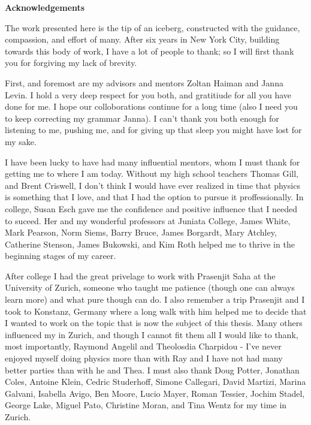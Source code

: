 \newpage

\begin{center}
    {\large \bf Acknowledgements }
\end{center}

\vspace{-0.2cm}


The work presented here is the tip of an iceberg, constructed with the
guidance, compassion, and effort of many. After six years in New York City,
building towards this body of work, I have a lot of people to thank; so
I will first thank you for forgiving my lack of brevity.

First, and foremost are my advisors and mentors Zoltan Haiman and Janna
Levin. I hold a very deep respect for you both, and gratitiude for all you
have done for me. I hope our colloborations continue for a long time (also I
need you to keep correcting my grammar Janna). I can't thank you both enough
for listening to me, pushing me, and for giving up that sleep you might have
lost for my sake.

I have been lucky to have had many influential mentors, whom I must thank for
getting me to where I am today. Without my high school teachers Thomas Gill,
and Brent Criswell, I don't think I would have ever realized in time that
physics is something that I love, and that I had the option to pursue it
proffessionally. In college, Susan Esch gave me the confidence and positive
influence that I needed to suceed. Her and my wonderful professors at Juniata
College, James White, Mark Pearson, Norm Siems, Barry Bruce, James Borgardt,
Mary Atchley, Catherine Stenson, James Bukowski, and Kim Roth helped me to
thrive in the beginning stages of my career.

After college I had the great privelage to work with Prasenjit Saha at the
University of Zurich, someone who taught me patience (though one can always
learn more) and what pure though can do. I also remember a trip Prasenjit and
I took to Konstanz, Germany where a long walk with him helped me to decide
that I wanted to work on the topic that is now the subject of this thesis.
Many others influenced my in Zurich, and though I cannot fit them all I would
like to thank, most importantly, Raymond Angelil and Theolosdia Charpidou -
I've never enjoyed myself doing physics more than with Ray and I have not had
many better parties than with he and Thea. I must also thank Doug Potter,
Jonathan Coles, Antoine Klein, Cedric Studerhoff, Simone Callegari, David
Martizi, Marina Galvani, Isabella Avigo, Ben Moore, Lucio Mayer, Roman
Tessier, Jochim Stadel, George Lake, Miguel Pato, Christine Moran, and Tina
Wentz for my time in Zurich.

